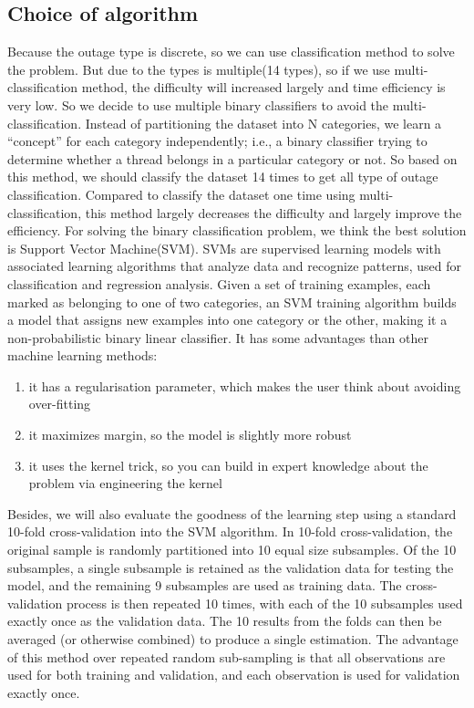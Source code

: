 \documentclass{sig-alternate}
\begin{document}
\subsection{Choice of algorithm}
Because the outage type is discrete, so we can use classification method to solve the problem. But due to the types is multiple(14 types), so if we use multi-classification method, the difficulty will increased largely  and time efficiency is very low. So we decide to use multiple binary classifiers to avoid the multi-classification. Instead of partitioning the dataset into N categories, we learn a “concept” for each category independently; i.e., a binary classifier trying to determine whether a thread belongs in a particular category or not. So based on this method, we should classify the dataset 14 times to get all type of outage classification. Compared to classify the dataset one time using multi-classification, this method largely decreases the difficulty and largely improve the efficiency. For solving the binary classification problem, we think the best solution is Support Vector Machine(SVM). SVMs are supervised learning models with associated learning algorithms that analyze data and recognize patterns, used for classification and regression analysis. Given a set of training examples, each marked as belonging to one of two categories, an SVM training algorithm builds a model that assigns new examples into one category or the other, making it a non-probabilistic binary linear classifier. It has some advantages than other machine learning methods:
\begin{enumerate}
\item{it has a regularisation parameter, which makes the user think about avoiding over-fitting}
\item{it maximizes margin, so the model is slightly more robust}
\item{it uses the kernel trick, so you can build in expert knowledge about the problem via engineering the kernel}
\end{enumerate}
Besides, we will also evaluate the goodness of the learning step using a standard 10-fold cross-validation into the SVM algorithm. In 10-fold cross-validation, the original sample is randomly partitioned into 10 equal size subsamples. Of the 10 subsamples, a single subsample is retained as the validation data for testing the model, and the remaining 9 subsamples are used as training data. The cross-validation process is then repeated 10 times, with each of the 10 subsamples used exactly once as the validation data. The 10 results from the folds can then be averaged (or otherwise combined) to produce a single estimation. The advantage of this method over repeated random sub-sampling is that all observations are used for both training and validation, and each observation is used for validation exactly once.
\end{document}
